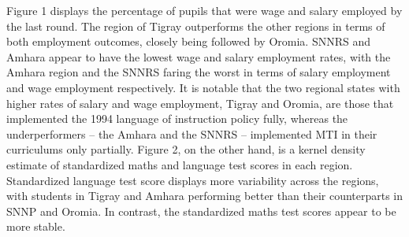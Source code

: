Figure 1 displays the percentage of pupils that were wage and salary employed by the last round. The region of Tigray outperforms the other regions in terms of both employment outcomes, closely being followed by Oromia. SNNRS and Amhara appear to have the lowest wage and salary employment rates, with the Amhara region and the SNNRS faring the worst in terms of salary employment and wage employment respectively. It is notable that the two regional states with higher rates of salary and wage employment, Tigray and Oromia, are those that implemented the 1994 language of instruction policy fully, whereas the underperformers – the Amhara and the SNNRS – implemented MTI in their curriculums only partially. Figure 2, on the other hand, is a kernel density estimate of standardized maths and language test scores in each region. Standardized language test score displays more variability across the regions, with students in Tigray and Amhara performing better than their counterparts in SNNP and Oromia. In contrast, the standardized maths test scores appear to be more stable.



